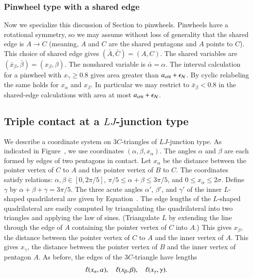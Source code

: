 \subsubsection{Pinwheel type with a shared edge}

Now we specialize this discussion of Section  to
pinwheels.  Pinwheels have a rotational symmetry, so we may assume
without loss of generality that the shared edge is $A\to C$ (meaning,
$A$ and $C$ are the shared pentagons and $A$ points to $C$).  This
choice of shared edge gives $(\bar A,\bar C) = (A,C)$.  The shared
variables are $(\bar x_\beta,\bar\beta)=(x_\beta,\beta)$.  The
nonshared variable is $\bar\alpha=\alpha$. The interval calculation
for a pinwheel with $x_\gamma\ge0.8$ gives area greater than
$a_\text{crit}+\epsilon_{\mathcal N}$. By cyclic relabeling the same holds for $x_\alpha$
and $x_\beta$. In particular we may restrict to $\bar x_\beta<0.8$
in the shared-edge calculations with area at most $a_\text{crit}+\epsilon_{\mathcal N}$.

\subsection{Triple contact at a $LJ$-junction type}

We describe a coordinate system on $3C$-triangles of $LJ$-junction
type.  As indicated in Figure~, we use coordinates
$(\alpha,\beta,x_\alpha)$.  The angles $\alpha$ and $\beta$ are each
formed by edges of two pentagons in contact.  Let $x_\alpha$ be the
distance between the pointer vertex of $C$ to $A$ and the pointer
vertex of $B$ to $C$.  The coordinates satisfy relations:
$\alpha,\beta\in [0,2\pi/5]$, $\pi/5\le\alpha+\beta\le 3\pi/5$, and
$0\le x_\alpha\le 2\sigma$.  Define $\gamma$ by
$\alpha+\beta+\gamma=3\pi/5$.  The three acute angles $\alpha'$,
$\beta'$, and $\gamma'$ of the inner $L$-shaped quadrilateral are
given by Equation~.  The edge lengths of the $L$-shaped
quadrilateral are easily computed by triangulating the quadrilateral
into two triangles and applying the law of sines.  (Triangulate $L$ by
extending the line through the edge of $A$ containing the pointer
vertex of $C$ into $A$.)  This gives $x_\beta$, the distance between
the pointer vertex of $C$ to $A$ and the inner vertex of $A$.  This
gives $x_\gamma$, the distance between the pointer vertex of $B$ and
the inner vertex of pentagon $A$.  As before, the edges of the
$3C$-triangle have lengths
\[
\ell(x_\alpha,\alpha),\quad \ell(x_\beta,\beta),\quad \ell(x_\gamma,\gamma).
\]

